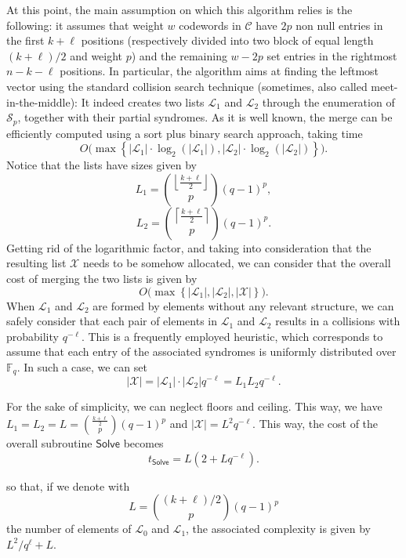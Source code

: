 At this point, the main assumption on which this algorithm relies is the following: it assumes that weight $w$ codewords in $\mathscr C$ have $2p$ non null entries in the first $k + \ell$ positions (respectively divided into two block of equal length $(k+\ell)/2$ and weight $p$) and the remaining $w-2p$ set entries in the rightmost $n-k-\ell$ positions.
In particular, the algorithm aims at finding the leftmost vector using the standard collision search technique (sometimes, also called meet-in-the-middle): 
It indeed creates two lists $\mathscr{L}_1$ and $\mathscr{L}_2$ through the enumeration of $\mathscr S_p$, together with their partial syndromes.
As it is well known, the merge can be efficiently computed using a sort plus binary search approach, taking time
$$O\big(\max\left\{|\mathscr L_1|\cdot\log_2\left(|\mathscr L_1|\right), |\mathscr L_2|\cdot\log_2\left(|\mathscr L_2|\right)\right\}\big).$$
Notice that the lists have sizes given by
$$L_1 = \binom{\left\lfloor\frac{k+\ell}{2}\right\rfloor}{p}(q-1)^p,$$
$$L_2 = \binom{\left\lceil\frac{k+\ell}{2}\right\rceil}{p}(q-1)^p.$$
Getting rid of the logarithmic factor, and taking into consideration that the resulting list $\mathscr X$ needs to be somehow allocated, we can consider that the overall cost of merging the two lists is given by
$$ O\big(\max\left\{|\mathscr L_1|, |\mathscr L_2|, |\mathscr X|\right\}\big).$$
When $\mathscr L_1$ and $\mathscr L_2$ are formed by elements without any relevant structure, we can safely consider that each pair of elements in $\mathscr L_1$ and $\mathscr L_2$ results in a collisions with probability $q^{-{\ell}}$.
This is a frequently employed heuristic, which corresponds to assume that each entry of the associated syndromes is uniformly distributed over $\mathbb F_q$.
In such a case, we can set 
$$|\mathscr X| = |\mathscr L_1|\cdot|\mathscr L_2| q^{-{\ell}} = L_1L_2q^{-\ell}.$$ 
\begin{remark}
For the sake of simplicity, we can neglect floors and ceiling.
This way, we have $L_1 = L_2 = L = \binom{\frac{k+\ell}{2}}{p}(q-1)^p$ and $|\mathscr X| = L^2q^{-\ell}.$
This way, the cost of the overall subroutine $\mathsf{Solve}$ becomes
$$t_{\mathsf{Solve}} = L\left(2+Lq^{-\ell}\right).$$
\end{remark}
so that, if we denote with $$ L = \binom{(k+\ell)/2}{p} (q-1)^p$$ the number of elements of $\mathscr{L}_0$ and $\mathscr{L}_1$, the associated complexity is given by $L^2/q^{\ell}+L$.
